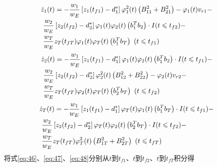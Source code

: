 \begin{equation}
\label{eq:46}
\begin{gathered}
  {{\dot z}_1}(t) =  - \frac{{{w_1}}}{{{w_E}}}\left[ {{z_1}({t_{f1}}) - d_1^*} \right]\varphi _1^2(t)\left( {B_{11}^2 + B_{21}^2} \right) - {\varphi _1}(t){v_{r1}} -  \hfill \\
  {\text{          }}\frac{{{w_2}}}{{{w_E}}}\left[ {{z_2}({t_{f2}}) - d_2^*} \right]{\varphi _1}(t){\varphi _2}(t)\left( {b_1^T{b_2}} \right) \cdot I(t \leqslant {t_{f2}}) - \quad  \hfill \\
  {\text{          }}\frac{{{w_T}}}{{{w_E}}}{z_T}({t_{fT}}){\varphi _1}(t){\varphi _T}(t)\left( {b_1^T{b_T}} \right){\text{   }}(t \leqslant {t_{f1}}) \hfill \\ 
\end{gathered}
\end{equation}
\begin{equation}
\label{eq:47}
\begin{gathered}
  {{\dot z}_2}(t) =  - \frac{{{w_1}}}{{{w_E}}}\left[ {{z_1}({t_{f1}}) - d_1^*} \right]{\varphi _1}(t){\varphi _2}(t)\left( {b_1^T{b_2}} \right) \cdot I(t \leqslant {t_{f1}}) -  \hfill \\
  {\text{          }}\frac{{{w_2}}}{{{w_E}}}\left[ {{z_2}({t_{f2}}) - d_2^*} \right]\varphi _2^2(t)\left( {B_{12}^2 + B_{22}^2} \right) - {\varphi _2}(t){v_{r2}} -  \hfill \\
  {\text{          }}\frac{{{w_T}}}{{{w_E}}}{z_T}({t_{fT}}){\varphi _2}(t){\varphi _T}(t)\left( {b_2^T{b_T}} \right){\text{   }}(t \leqslant {t_{f2}}) \hfill \\ 
\end{gathered}
\end{equation}
\begin{equation}
\label{eq:48}
\begin{gathered}
  {{\dot z}_T}(t) =  - \frac{{{w_1}}}{{{w_E}}}\left[ {{z_1}({t_{f1}}) - d_1^*} \right]{\varphi _T}(t){\varphi _1}(t)\left( {b_1^T{b_T}} \right) \cdot I(t \leqslant {t_{f1}}) -  \hfill \\
  {\text{          }}\frac{{{w_2}}}{{{w_E}}}\left[ {{z_2}({t_{f2}}) - d_2^*} \right]{\varphi _T}(t){\varphi _2}(t)\left( {b_2^T{b_T}} \right) \cdot I(t \leqslant {t_{f2}}) - \quad  \hfill \\
  {\text{          }}\frac{{{w_T}}}{{{w_E}}}{z_T}({t_{fT}})\varphi _T^2(t)\left( {B_{1T}^2 + B_{2T}^2} \right){\text{   }}(t \leqslant {t_{fT}}) \hfill \\ 
\end{gathered}
\end{equation}
将式\eqref{eq:46}、\eqref{eq:47}、\eqref{eq:48}分别从$t$到${t_{f1}}$、$t$到${t_{f2}}$、$t$到${t_{fT}}$积分得

